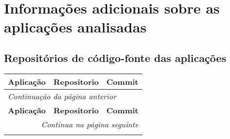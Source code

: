\apendice

\chapter{Informações adicionais sobre as aplicações analisadas }
\label{sec:apendice}

\section{Repositórios de código-fonte das aplicações}

\footnotesize
\begin{longtable}{| l | l | l |}
  	\hline
  	
  	\textbf{Aplicação} & \textbf{Repositorio} & \textbf{Commit}  \\
 	\hline
 	\endfirsthead
 	
 	\multicolumn{3}{l}{\textit{Continuação da página anterior}} \\
 	\hline
 	
 	\textbf{Aplicação} & \textbf{Repositorio} & \textbf{Commit}  \\
 	\hline
 	\endhead
 	\hline \multicolumn{3}{r}{\textit{Continua na página seguinte}} \\
 	\endfoot
 	\hline
 	\endlastfoot
 	

\end{longtable}
